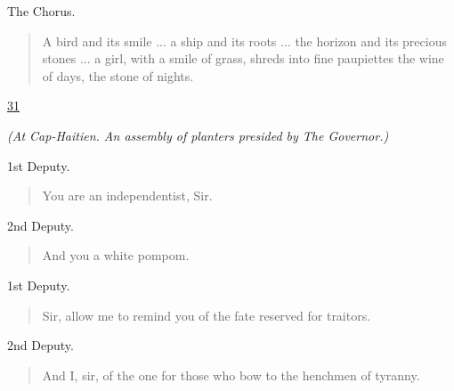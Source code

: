 \documentclass[letterpaper,article,12pt,oneside,notitlepage]{memoir}
\begin{document}
\begin{center}The Chorus.\end{center}

\begin{verse}
\indent A bird and its smile ... a ship and its roots ... the horizon and its precious stones ... a girl, with a smile of grass, shreds into fine paupiettes the wine of days, the stone of nights. \\
\end{verse}

\clearpage

\href{http://cesaire.elotroalex.com/chiens/chiens/p031.html}{31}

\textit{(At Cap-Haitien. An assembly of planters presided by The Governor.)}

\begin{center}1st Deputy.\end{center}

\begin{verse}
\hspace{1cm} You are an independentist, Sir. \\
\end{verse}

\begin{center}2nd Deputy.\end{center}

\begin{verse}
\hspace{1cm} And you a white pompom. \\
\end{verse}

\begin{center}1st Deputy.\end{center}

\begin{verse}
\hspace{1cm} Sir, allow me to remind you of the fate reserved for traitors. \\
\end{verse}

\begin{center}2nd Deputy.\end{center}

\begin{verse}
\hspace{1cm} And I, sir, of the one for those who bow to the henchmen of tyranny. \\
\end{verse}
\end{document}
